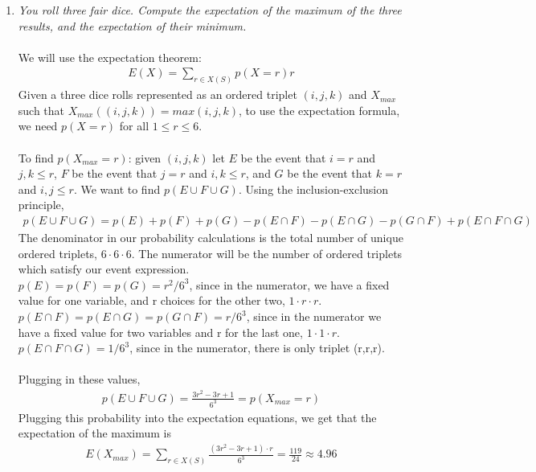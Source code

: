 \documentclass[a4paper]{article}
\begin{document}
\begin{enumerate}
\item \emph{You roll three fair dice. Compute the expectation of the maximum of the three results, and the expectation of their minimum.} \\
\\
We will use the expectation theorem:
\begin{align}
\nonumber\displaystyle E(X) = \sum\limits_{r \in X(S)} p(X = r)r
\end{align}
Given a three dice rolls represented as an ordered triplet $(i,j,k)$ and $X_{max}$ such that $X_{max}((i,j,k)) = max(i,j,k)$, to use the expectation formula, we need $p(X = r)$ for all $1 \leq r \leq 6$. \\
\\
To find $p(X_{max} = r)$: given $(i,j,k)$ let $E$ be the event that $i = r$ and $j,k \leq r$, $F$ be the event that $j = r$ and $i,k \leq r$, and $G$ be the event that $k = r$ and $i,j \leq r$. We want to find $p(E \cup F \cup G)$. Using the inclusion-exclusion principle,
\begin{align}
\nonumber p(E \cup F \cup G) = p(E) + p(F) + p(G) - p(E \cap F) - p(E \cap G) - p(G \cap F) + p(E \cap F \cap G)
\end{align}
The denominator in our probability calculations is the total number of unique ordered triplets, $6 \cdot 6 \cdot 6$. The numerator will be the number of ordered triplets which satisfy our event expression. \\
$p(E) = p(F) = p(G) = r^2/6^3$, since in the numerator, we have a fixed value for one variable, and r choices for the other two, $1 \cdot r \cdot r$.\\
$p(E \cap F) = p(E \cap G) = p(G \cap F) = r/6^3$, since in the numerator we have a fixed value for two variables and r for the last one, $1 \cdot 1 \cdot r$. \\ 
$p(E \cap F \cap G) = 1/6^3$, since in the numerator, there is only  triplet (r,r,r). \\
\\
Plugging in these values, 
\begin{align}
\nonumber\displaystyle p(E \cup F \cup G) = \frac{3r^2 - 3r + 1}{6^3} = p(X_{max} = r)
\end{align}
Plugging this probability into the expectation equations, we get that the expectation of the maximum is
\begin{align}
\nonumber\displaystyle E(X_{max}) = \sum\limits_{r \in X(S)} \frac{(3r^2 - 3r + 1) \cdot r}{6^3} = \frac{119}{24} \approx 4.96
\end{align}

\end{enumerate}
\end{document}
